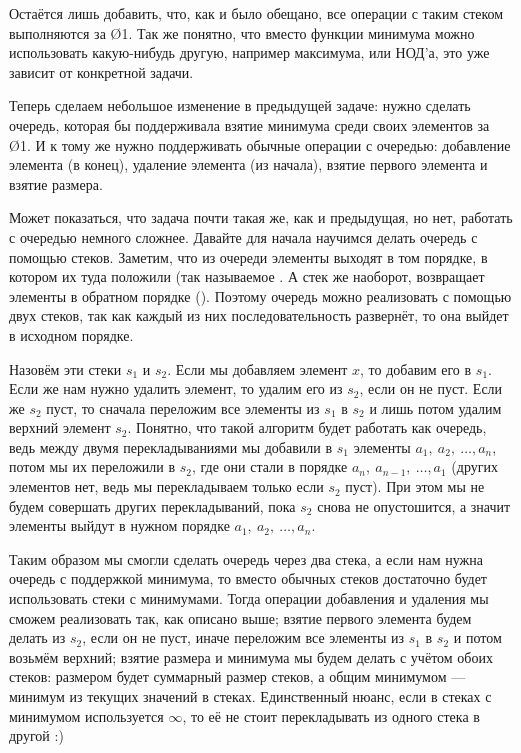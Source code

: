 
Остаётся лишь добавить, что, как и было обещано, все операции с таким стеком выполняются за \O{1}. Так же понятно, что вместо функции минимума можно использовать какую-нибудь другую, например максимума, или НОД'а, это уже зависит от конкретной задачи.


Теперь сделаем небольшое изменение в предыдущей задаче: нужно сделать очередь, которая бы поддерживала взятие минимума среди своих элементов за \O{1}. И к тому же нужно поддерживать обычные операции с очередью: добавление элемента (в конец), удаление элемента (из начала), взятие первого элемента и взятие размера. 

Может показаться, что задача почти такая же, как и предыдущая, но нет, работать с очередью немного сложнее. Давайте для начала научимся делать очередь с помощью стеков. Заметим, что из очереди элементы выходят в том порядке, в котором их туда положили (так называемое . А стек же наоборот, возвращает элементы в обратном порядке (). Поэтому очередь можно реализовать с помощью двух стеков, так как каждый из них последовательность развернёт, то она выйдет в исходном порядке.

Назовём эти стеки $s_1$ и $s_2$. Если мы добавляем элемент $x$, то добавим его в $s_1$. Если же нам нужно удалить элемент, то удалим его из $s_2$, если он не пуст. Если же $s_2$ пуст, то сначала переложим все элементы из $s_1$ в $s_2$ и лишь потом удалим верхний элемент $s_2$. Понятно, что такой алгоритм будет работать как очередь, ведь между двумя перекладываниями мы добавили в $s_1$ элементы $a_1,\ a_2,\ \ldots, a_n$, потом мы их переложили в $s_2$, где они стали в порядке $a_n,\ a_{n - 1},\ \ldots, a_1$ (других элементов нет, ведь мы перекладываем только если $s_2$ пуст). При этом мы не будем совершать других перекладываний, пока $s_2$ снова не опустошится, а значит элементы выйдут в нужном порядке $a_1,\ a_2,\ \ldots, a_n$.

Таким образом мы смогли сделать очередь через два стека, а если нам нужна очередь с поддержкой минимума, то вместо обычных стеков достаточно будет использовать стеки с минимумами. Тогда операции добавления и удаления мы сможем реализовать так, как описано выше; взятие первого элемента будем делать из $s_2$, если он не пуст, иначе переложим все элементы из $s_1$ в $s_2$ и потом возьмём верхний; взятие размера и минимума мы будем делать с учётом обоих стеков: размером будет суммарный размер стеков, а общим минимумом — минимум из текущих значений в стеках. Единственный нюанс, если в стеках с минимумом используется $\infty$, то её не стоит перекладывать из одного стека в другой :)

